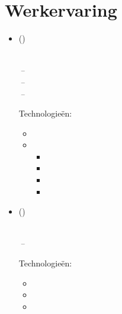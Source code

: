 \documentclass[11pt,a4paper]{article}
\begin{document}
\section{Werkervaring}
\begin{itemize}[leftmargin=0pt,label={},itemsep=2em,topsep=0pt]
\item \parbox{\textwidth}{\textbf{\KhonraadNameNL} {\color{secondary}\small(\KhonraadCompanyDescriptionNL)} \hfill \textit{\KhonraadLocationNL}}\\
\textit{\KhonraadThirdJobTitleNL} \hfill \textit{\KhonraadThirdJobStartNL\,--\,\KhonraadThirdJobEndNL}\\
\textit{\KhonraadSecondJobTitleNL} \hfill \textit{\KhonraadSecondJobStartNL\,--\,\KhonraadSecondJobEndNL}\\
\textit{\KhonraadFirstJobTitleNL} \hfill \textit{\KhonraadFirstJobStartNL\,--\,\KhonraadFirstJobEndNL}

\vspace{0.2cm}
{\color{secondary}Technologieën:} \KhonraadTechnologyNL
\vspace{0.3cm}
\begin{itemize}[leftmargin=*,topsep=-6pt,parsep=0pt,partopsep=0pt,itemsep=0pt]
    \item \KhonraadJavaNL
    \item \KhonraadInnovationNL
    \begin{itemize}[leftmargin=*,topsep=0pt,parsep=0pt,partopsep=0pt,itemsep=0pt,label={--}]
        \item \KhonraadChatbotsNL
        \item \KhonraadMobileNL
        \item \KhonraadAndroidNL
        \item \KhonraadMPSNL
    \end{itemize}
\end{itemize} 


\item \parbox{\textwidth}{\textbf{\McfunshineNameNL} {\color{secondary}\small(\McfunshineCompanyDescriptionNL)} \hfill \textit{\McfunshineLocationNL}}\\
\textit{\McfunshineJobTitleNL} \hfill \textit{\McfunshineJobStartNL\,--\,\McfunshineJobEndNL}

\vspace{0.2cm}
{\color{secondary}Technologieën:} \McfunshinePodmorphTechnologyNL
\vspace{0.3cm}
\begin{itemize}[leftmargin=*,topsep=-6pt,parsep=0pt,partopsep=0pt,itemsep=0pt]
    \item \McfunshinePodmorphNL
    \item \McfunshinePodmorphAINL
    \item \McfunshinePodmorphBakerNL
\end{itemize}


\end{itemize}
\end{document}
